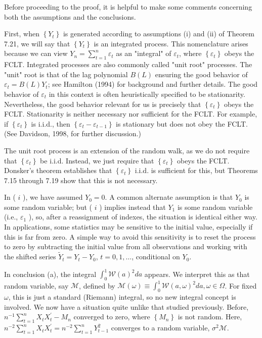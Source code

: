 \documentclass[10pt]{article}
\begin{document}
Before proceeding to the proof, it is helpful to make some comments concerning both the assumptions and the conclusions.

First, when $\left\{Y_{t}\right\}$ is generated according to assumptions (i) and (ii) of Theorem 7.21, we will say that $\left\{Y_{t}\right\}$ is an integrated process. This nomenclature arises because we can view $Y_{n}=\sum_{t=1}^{n} \varepsilon_{t}$ as an "integral" of $\varepsilon_{t}$, where $\left\{\varepsilon_{t}\right\}$ obeys the FCLT. Integrated processes are also commonly called "unit root" processes. The "unit" root is that of the lag polynomial $B(L)$ ensuring the good behavior of $\varepsilon_{t}=B(L) Y_{t}$; see Hamilton (1994) for background and further details. The good behavior of $\varepsilon_{t}$ in this context is often heuristically specified to be stationarity. Nevertheless, the good behavior relevant for us is precisely that $\left\{\varepsilon_{t}\right\}$ obeys the FCLT. Stationarity is neither necessary nor sufficient for the FCLT. For example, if $\left\{\varepsilon_{t}\right\}$ is i.i.d., then $\left\{\varepsilon_{t}-\varepsilon_{t-1}\right\}$ is stationary but does not obey the FCLT. (See Davidson, 1998, for further discussion.)

The unit root process is an extension of the random walk, as we do not require that $\left\{\varepsilon_{t}\right\}$ be i.i.d. Instead, we just require that $\left\{\varepsilon_{t}\right\}$ obeys the FCLT. Donsker's theorem establishes that $\left\{\varepsilon_{t}\right\}$ i.i.d. is sufficient for this, but Theorems 7.15 through 7.19 show that this is not necessary.

In ( $i$ ), we have assumed $Y_{0}=0$. A common alternate assumption is that $Y_{0}$ is some random variable; but ( $i$ ) implies instead that $Y_{1}$ is some random variable (i.e., $\varepsilon_{1}$ ), so, after a reassignment of indexes, the situation is identical either way. In applications, some statistics may be sensitive to the initial value, especially if this is far from zero. A simple way to avoid this sensitivity is to reset the process to zero by subtracting the initial value from all observations and working with the shifted series $\tilde{Y}_{t}=Y_{t}-Y_{0}$, $t=0,1, \ldots$, conditional on $Y_{0}$.

In conclusion (a), the integral $\int_{0}^{1} \mathcal{W}(a)^{2} d a$ appears. We interpret this as that random variable, say $\mathcal{M}$, defined by $\mathcal{M}(\omega) \equiv \int_{0}^{1} \mathcal{W}(a, \omega)^{2} d a, \omega \in \Omega$. For fixed $\omega$, this is just a standard (Riemann) integral, so no new integral concept is involved. We now have a situation quite unlike that studied previously. Before, $n^{-1} \sum_{t=1}^{n} X_{t} X_{t}^{\prime}-M_{n}$ converged to zero, where $\left\{M_{n}\right\}$ is not random. Here, $n^{-2} \sum_{t=1}^{n} X_{t} X_{t}^{\prime}=n^{-2} \sum_{t=1}^{n} Y_{t-1}^{2}$ converges to a random variable, $\sigma^{2} \mathcal{M}$.
\end{document}
